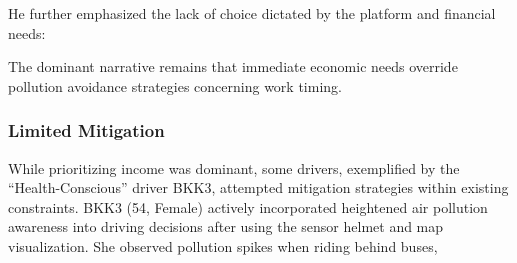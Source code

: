 \qpadding
{}
\qpadding

He further emphasized the lack of choice dictated by the platform and financial needs:

\qpadding
{}
\qpadding



The dominant narrative remains that immediate economic needs override pollution avoidance strategies concerning work timing.

\subsubsection{Limited Mitigation}
While prioritizing income was dominant, some drivers, exemplified by the ``Health-Conscious'' driver BKK3, attempted mitigation strategies within existing constraints.
BKK3 (54, Female) actively incorporated heightened air pollution awareness into driving decisions after using the sensor helmet and map visualization.
She observed pollution spikes when riding behind buses,

